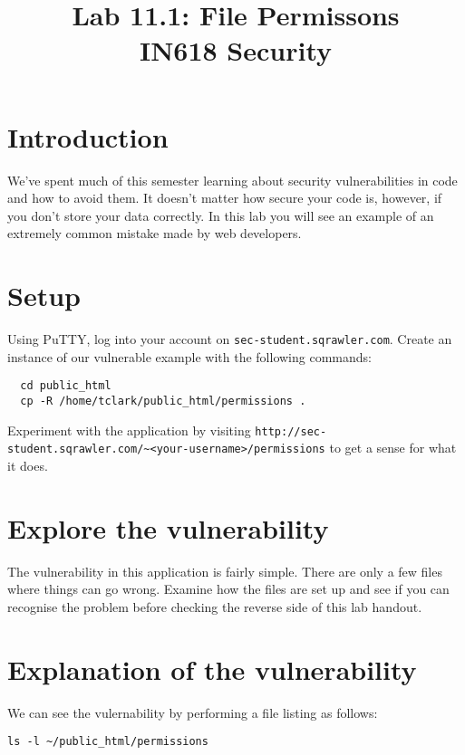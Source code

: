 \documentclass{article}
\begin{document}
\title{ Lab 11.1: File Permissons \\ IN618 Security}
\maketitle

\section*{Introduction}
We've spent much of this semester learning about security vulnerabilities in code and how to avoid them.  It doesn't matter how secure your code is, however, if you don't store your data correctly. In this lab you will see an example of an extremely common mistake made by web developers.

\section{Setup}
Using PuTTY, log into your account on \texttt{sec-student.sqrawler.com}.  Create an instance of our vulnerable example with the following commands:

\begin{verbatim}
  cd public_html
  cp -R /home/tclark/public_html/permissions .
\end{verbatim}

Experiment with the application by visiting \texttt{http://sec-student.sqrawler.com/\textasciitilde{}<your-username>/permissions} to get a sense for what it does.

\section{Explore the vulnerability}
The vulnerability in this application is fairly simple.  There are only a few files where things can go wrong.  Examine how the files are set up and see if you can recognise the problem before checking the reverse side of this lab handout.

\newpage

\section{Explanation of the vulnerability}
We can see the vulernability by performing a file listing as follows:

\begin{verbatim}
ls -l ~/public_html/permissions 
\end{verbatim}
\end{document}
